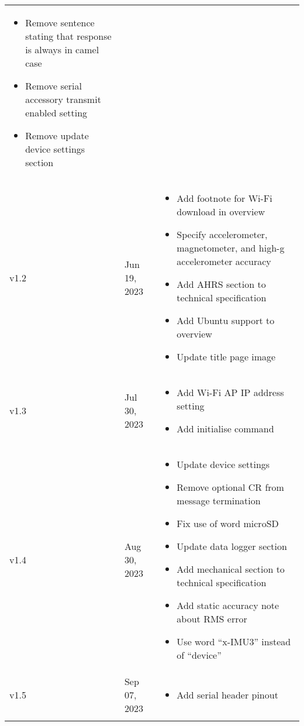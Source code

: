 \begin{longtable}{| >{\centering}p{} | p{} | >{\raggedright\arraybackslash}p{} |}
\begin{itemize}
			\item Remove sentence stating that response is always in camel case
            \item Remove serial accessory transmit enabled setting
            \item Remove update device settings section
        \end{itemize}\\
        v1.2 & Jun 19, 2023 &
        \begin{itemize}
			\item Add footnote for Wi-Fi download in overview
			\item Specify accelerometer, magnetometer, and high-g accelerometer accuracy
			\item Add AHRS section to technical specification
			\item Add Ubuntu support to overview
			\item Update title page image
        \end{itemize}\\
        v1.3 & Jul 30, 2023 &
        \begin{itemize}
			\item Add Wi-Fi \ac{AP} \ac{IP} address setting
			\item Add initialise command
        \end{itemize}\\
        v1.4 & Aug 30, 2023 &
        \begin{itemize}
			\item Update device settings
			\item Remove optional CR from message termination
			\item Fix use of word \ac{microSD}
			\item Update data logger section
			\item Add mechanical section to technical specification
			\item Add static accuracy note about \acs{RMS} error
            \item Use word \enquote{x-IMU3} instead of \enquote{device}
		\end{itemize}\\
        v1.5 & Sep 07, 2023 &
        \begin{itemize}
			\item Add serial header pinout
		\end{itemize}\\
        \arrayrulecolor{gray!50}\hline
    \end{longtable}
\endgroup
